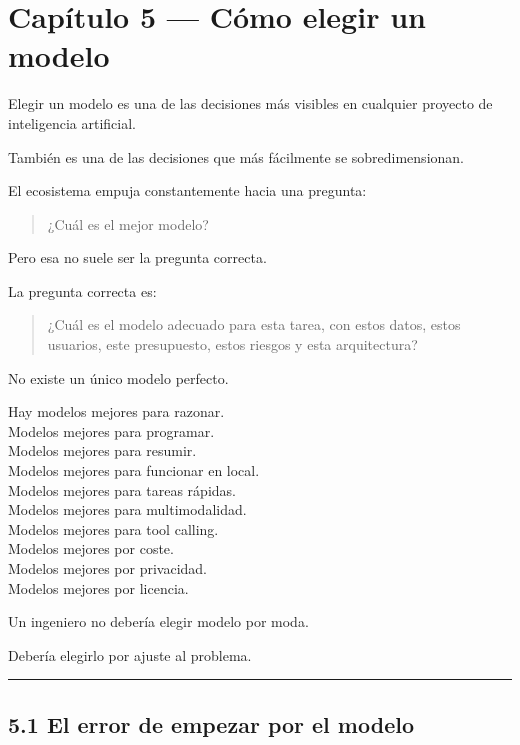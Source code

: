 \newpage

\chapter{Capítulo 5 --- Cómo elegir un
modelo}\label{capuxedtulo-5-cuxf3mo-elegir-un-modelo}

Elegir un modelo es una de las decisiones más visibles en cualquier
proyecto de inteligencia artificial.

También es una de las decisiones que más fácilmente se sobredimensionan.

El ecosistema empuja constantemente hacia una pregunta:

\begin{quote}
¿Cuál es el mejor modelo?
\end{quote}

Pero esa no suele ser la pregunta correcta.

La pregunta correcta es:

\begin{quote}
¿Cuál es el modelo adecuado para esta tarea, con estos datos, estos
usuarios, este presupuesto, estos riesgos y esta arquitectura?
\end{quote}

No existe un único modelo perfecto.

Hay modelos mejores para razonar.\\
Modelos mejores para programar.\\
Modelos mejores para resumir.\\
Modelos mejores para funcionar en local.\\
Modelos mejores para tareas rápidas.\\
Modelos mejores para multimodalidad.\\
Modelos mejores para tool calling.\\
Modelos mejores por coste.\\
Modelos mejores por privacidad.\\
Modelos mejores por licencia.

Un ingeniero no debería elegir modelo por moda.

Debería elegirlo por ajuste al problema.

\begin{center}\rule{0.5\linewidth}{0.5pt}\end{center}

\section{5.1 El error de empezar por el
modelo}\label{el-error-de-empezar-por-el-modelo}

